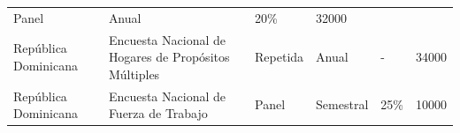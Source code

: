 \begin{longtable}[]{@{}llllll@{}}
\begin{minipage}[t]{0.06\columnwidth}
Panel\strut
\end{minipage} & \begin{minipage}[t]{0.08\columnwidth}\raggedright
Anual\strut
\end{minipage} & \begin{minipage}[t]{0.06\columnwidth}\raggedright
20\%\strut
\end{minipage} & \begin{minipage}[t]{0.13\columnwidth}\raggedright
32000\strut
\end{minipage}\tabularnewline
\begin{minipage}[t]{0.13\columnwidth}\raggedright
República Dominicana\strut
\end{minipage} & \begin{minipage}[t]{0.38\columnwidth}\raggedright
Encuesta Nacional de Hogares de Propósitos Múltiples\strut
\end{minipage} & \begin{minipage}[t]{0.06\columnwidth}\raggedright
Repetida\strut
\end{minipage} & \begin{minipage}[t]{0.08\columnwidth}\raggedright
Anual\strut
\end{minipage} & \begin{minipage}[t]{0.06\columnwidth}\raggedright
-\strut
\end{minipage} & \begin{minipage}[t]{0.13\columnwidth}\raggedright
34000\strut
\end{minipage}\tabularnewline
\begin{minipage}[t]{0.13\columnwidth}\raggedright
República Dominicana\strut
\end{minipage} & \begin{minipage}[t]{0.38\columnwidth}\raggedright
Encuesta Nacional de Fuerza de Trabajo\strut
\end{minipage} & \begin{minipage}[t]{0.06\columnwidth}\raggedright
Panel\strut
\end{minipage} & \begin{minipage}[t]{0.08\columnwidth}\raggedright
Semestral\strut
\end{minipage} & \begin{minipage}[t]{0.06\columnwidth}\raggedright
25\%\strut
\end{minipage} & \begin{minipage}[t]{0.13\columnwidth}\raggedright
10000\strut
\end{minipage}\tabularnewline

\end{longtable}
